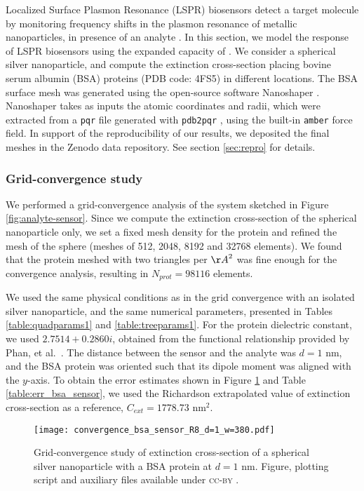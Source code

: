 Localized Surface Plasmon Resonance (LSPR) biosensors detect a target molecule by monitoring
frequency shifts in the plasmon resonance of metallic nanoparticles, in presence of an analyte \cite{WilletsVandyune2007}.
In this section, we model the response of LSPR biosensors using the expanded capacity of \pygbe.
We consider a spherical silver nanoparticle, and compute the extinction cross-section placing 
bovine serum albumin (BSA) proteins (PDB code: 4FS5) in different locations.
The BSA surface mesh was generated using the open-source software Nanoshaper \cite{Nanoshaper}. 
Nanoshaper takes as inputs the atomic coordinates and radii, which were 
extracted from a \texttt{pqr} file generated with \texttt{pdb2pqr} \cite{Dolinsky04},
 using the built-in \texttt{amber} force field.
 In support of the reproducibility of our results, we deposited the final meshes in the Zenodo data repository.
See section \ref{sec:repro} for details.

\subsubsection{Grid-convergence study} \label{sec:bsa_convergence}
We performed a grid-convergence 
analysis of the system sketched in Figure \ref{fig:analyte-sensor}. 
Since we compute the extinction cross-section of the spherical nanoparticle only, we 
set a fixed mesh density for the protein and refined the mesh of the
sphere (meshes of 512, 2048, 8192 and 32768 elements). We found that the protein meshed with two
triangles per ${\AA}^2$ was fine enough for the convergence analysis, resulting in $N_{prot} = 98116$ elements. 

We used the same physical conditions as in the grid convergence with an isolated silver nanoparticle, and the same numerical parameters, presented in Tables \ref{table:quadparams1} and \ref{table:treeparams1}.
For the protein dielectric constant, we used $2.7514 + 0.2860i$, obtained from the 
functional relationship provided by Phan, et al.~\cite{PhanETal2013}.
The distance between the sensor and the analyte was $d=1$ nm, 
and the BSA protein was oriented such that its dipole moment was aligned with the $y$-axis. 
To obtain the error estimates shown in Figure \ref{fig:error_sphere-bsa} and Table \ref{table:err_bsa_sensor},
we used the Richardson extrapolated value of extinction cross-section as a reference, 
$C_{ext}= 1778.73$ nm$^2$.


\begin{figure}[h] %
   \centering
   \texttt{[image: convergence\_bsa\_sensor\_R8\_d=1\_w=380.pdf]} 
   \caption{Grid-convergence study of extinction cross-section of a spherical silver
            nanoparticle with a BSA protein at $d=1$ nm. Figure, plotting script and auxiliary files available under \textsc{cc-by} \cite{ClementiETal2018c}.}
   \label{fig:error_sphere-bsa}
\end{figure}

